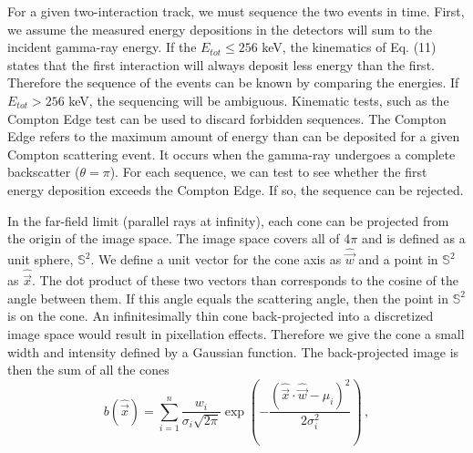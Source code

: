 \documentclass[10pt]{article}
\begin{document}
For a given two-interaction track, we must sequence the two events in time. First, we assume the measured energy depositions in the detectors will sum to the incident gamma-ray energy. If the $E_{tot} \leq 256$ keV, the kinematics of Eq. (11) states that the first interaction will always deposit less energy than the first. Therefore the sequence of the events can be known by comparing the energies. If $E_{tot} > 256$ keV, the sequencing will be ambiguous. Kinematic tests, such as the Compton Edge test can be used to discard forbidden sequences. The Compton Edge refers to the maximum amount of energy than can be deposited for a given Compton scattering event. It occurs when the gamma-ray undergoes a complete backscatter ($\theta = \pi$). For each sequence, we can test to see whether the first energy deposition exceeds the Compton Edge. If so, the sequence can be rejected. 

In the far-field limit (parallel rays at infinity), each cone can be projected from the origin of the image space. The image space covers all of 4$\pi$ and is defined as a unit sphere, $\mathbb{S}^2$. We define a unit vector for the cone axis as $\hat{\vec{w}}$ and a point in $\mathbb{S}^2$ as $\hat{\vec{x}}$. The dot product of these two vectors than corresponds to the cosine of the angle between them. If this angle equals the scattering angle, then the point in $\mathbb{S}^2$ is on the cone. An infinitesimally thin cone back-projected into a discretized image space would result in pixellation effects. Therefore we give the cone a small width and intensity defined by a Gaussian function. The back-projected image is then the sum of all the cones
%
\begin{equation}
b(\hat{\vec{x}}) = \sum_{i=1}^n \frac{w_i}{\sigma_i \sqrt{2\pi}} \exp\left( -\frac{(\hat{\vec{x}} \cdot \hat{\vec{w}} - \mu_i)^2}{2\sigma_i^2} \right)\,,
\end{equation}
\end{document}
